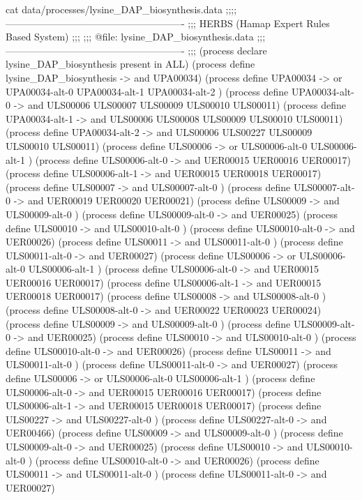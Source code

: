 cat data/processes/lysine_DAP_biosynthesis.data
;;;; -------------------------------------------------------
;;; HERBS (Hamap Expert Rules Based System)
;;;
;;; @file: lysine_DAP_biosynthesis.data
;;; -------------------------------------------------------
;;;
(process declare lysine_DAP_biosynthesis present in ALL)
(process define lysine_DAP_biosynthesis -> and UPA00034)
(process define UPA00034 -> or UPA00034-alt-0 UPA00034-alt-1 UPA00034-alt-2 )
(process define UPA00034-alt-0  -> and ULS00006 ULS00007 ULS00009 ULS00010 ULS00011)
(process define UPA00034-alt-1  -> and ULS00006 ULS00008 ULS00009 ULS00010 ULS00011)
(process define UPA00034-alt-2  -> and ULS00006 ULS00227 ULS00009 ULS00010 ULS00011)
(process define ULS00006 -> or ULS00006-alt-0 ULS00006-alt-1 )
(process define ULS00006-alt-0  -> and UER00015 UER00016 UER00017)
(process define ULS00006-alt-1  -> and UER00015 UER00018 UER00017)
(process define ULS00007 -> and ULS00007-alt-0 )
(process define ULS00007-alt-0  -> and UER00019 UER00020 UER00021)
(process define ULS00009 -> and ULS00009-alt-0 )
(process define ULS00009-alt-0  -> and UER00025)
(process define ULS00010 -> and ULS00010-alt-0 )
(process define ULS00010-alt-0  -> and UER00026)
(process define ULS00011 -> and ULS00011-alt-0 )
(process define ULS00011-alt-0  -> and UER00027)
(process define ULS00006 -> or ULS00006-alt-0 ULS00006-alt-1 )
(process define ULS00006-alt-0  -> and UER00015 UER00016 UER00017)
(process define ULS00006-alt-1  -> and UER00015 UER00018 UER00017)
(process define ULS00008 -> and ULS00008-alt-0 )
(process define ULS00008-alt-0  -> and UER00022 UER00023 UER00024)
(process define ULS00009 -> and ULS00009-alt-0 )
(process define ULS00009-alt-0  -> and UER00025)
(process define ULS00010 -> and ULS00010-alt-0 )
(process define ULS00010-alt-0  -> and UER00026)
(process define ULS00011 -> and ULS00011-alt-0 )
(process define ULS00011-alt-0  -> and UER00027)
(process define ULS00006 -> or ULS00006-alt-0 ULS00006-alt-1 )
(process define ULS00006-alt-0  -> and UER00015 UER00016 UER00017)
(process define ULS00006-alt-1  -> and UER00015 UER00018 UER00017)
(process define ULS00227 -> and ULS00227-alt-0 )
(process define ULS00227-alt-0  -> and UER00466)
(process define ULS00009 -> and ULS00009-alt-0 )
(process define ULS00009-alt-0  -> and UER00025)
(process define ULS00010 -> and ULS00010-alt-0 )
(process define ULS00010-alt-0  -> and UER00026)
(process define ULS00011 -> and ULS00011-alt-0 )
(process define ULS00011-alt-0  -> and UER00027)